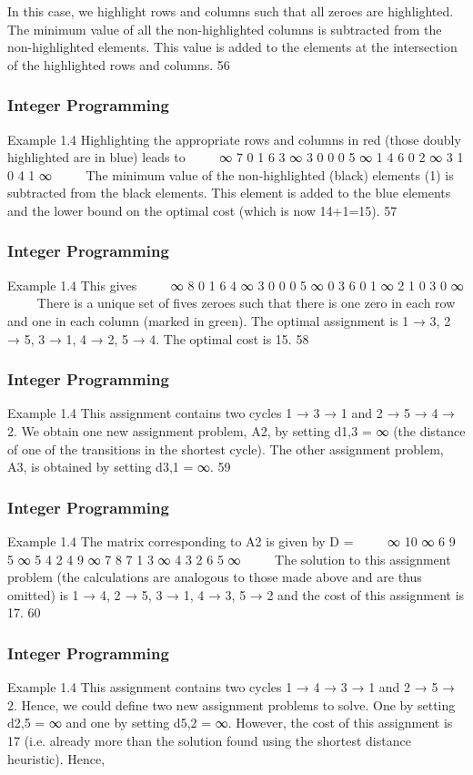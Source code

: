 \begin{frame}
In this case, we highlight rows and columns such that all zeroes are
highlighted.
The minimum value of all the non-highlighted columns is
subtracted from the non-highlighted elements.
This value is added to the elements at the intersection of the
highlighted rows and columns.
56 \end{frame}  \begin{frame} \frametitle{Integer Programming}     
Example 1.4
Highlighting the appropriate rows and columns in red (those
doubly highlighted are in blue) leads to


∞ 7 0 1 6
3 ∞ 3 0 0
0 5 ∞ 1 4
6 0 2 ∞ 3
1 0 4 1 ∞


The minimum value of the non-highlighted (black) elements (1) is
subtracted from the black elements.
This element is added to the blue elements and the lower bound on
the optimal cost (which is now 14+1=15).
57 \end{frame}  \begin{frame} \frametitle{Integer Programming}     
Example 1.4
This gives


∞ 8 0 1 6
4 ∞ 3 0 0
0 5 ∞ 0 3
6 0 1 ∞ 2
1 0 3 0 ∞


There is a unique set of fives zeroes such that there is one zero in
each row and one in each column (marked in green).
The optimal assignment is 1 → 3, 2 → 5, 3 → 1, 4 → 2, 5 → 4.
The optimal cost is 15.
58 \end{frame}  \begin{frame} \frametitle{Integer Programming}     
Example 1.4
This assignment contains two cycles 1 → 3 → 1 and
2 → 5 → 4 → 2.
We obtain one new assignment problem, A2, by setting d1,3 = ∞
(the distance of one of the transitions in the shortest cycle).
The other assignment problem, A3, is obtained by setting
d3,1 = ∞.
59 \end{frame}  \begin{frame} \frametitle{Integer Programming}     
Example 1.4
The matrix corresponding to A2 is given by
D =


∞ 10 ∞ 6 9
5 ∞ 5 4 2
4 9 ∞ 7 8
7 1 3 ∞ 4
3 2 6 5 ∞


The solution to this assignment problem (the calculations are
analogous to those made above and are thus omitted) is 1 → 4,
2 → 5, 3 → 1, 4 → 3, 5 → 2 and the cost of this assignment is 17.
60 \end{frame}  \begin{frame} \frametitle{Integer Programming}     
Example 1.4
This assignment contains two cycles 1 → 4 → 3 → 1 and
2 → 5 → 2.
Hence, we could define two new assignment problems to solve.
One by setting d2,5 = ∞ and one by setting d5,2 = ∞.
However, the cost of this assignment is 17 (i.e. already more than
the solution found using the shortest distance heuristic). Hence,

\end{frame}
